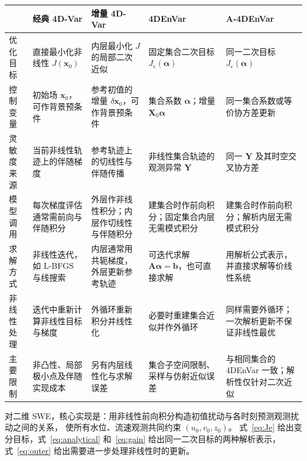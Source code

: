 \documentclass[11pt,a4paper]{article}
\newcommand{\xx}{\mathbf x}
\newcommand{\avec}{\bm\alpha}
\begin{document}
\begin{center}
\small
\setlength{\tabcolsep}{4pt}
\renewcommand{\arraystretch}{1.15}
\begin{tabularx}{\textwidth}{@{}>{\raggedright\arraybackslash}p{}
 >{\raggedright\arraybackslash}X
 >{\raggedright\arraybackslash}X
 >{\raggedright\arraybackslash}X
 >{\raggedright\arraybackslash}X@{}}
\toprule
 & 经典 4D-Var & 增量 4D-Var & 4DEnVar & A-4DEnVar\\
\midrule
优化目标 & 直接最小化非线性 $J(\xx_0)$ & 内层最小化 $J$ 的局部二次近似 & 固定集合二次目标 $J_e(\avec)$ & 同一二次目标 $J_e(\avec)$\\
\addlinespace
控制变量 & 初始场 $\xx_0$，可作背景预条件 & 参考初值的增量 $\delta\xx_0$，可作背景预条件 & 集合系数 $\avec$；增量 $\mathbf X_0\avec$ & 同一集合系数或等价协方差更新\\
\addlinespace
灵敏度来源 & 当前非线性轨迹上的伴随梯度 & 参考轨迹上的切线性与伴随传播 & 非线性集合轨迹的观测异常 $\mathbf Y$ & 同一 $\mathbf Y$ 及其时空交叉协方差\\
\addlinespace
模型调用 & 每次梯度评估通常需前向与伴随积分 & 外层作非线性积分；内层作切线性与伴随积分 & 建集合时作前向积分；固定集合内层无需模式积分 & 建集合时作前向积分；解析内层无需模式积分\\
\addlinespace
求解方式 & 非线性迭代，如 L-BFGS 与线搜索 & 内层通常用共轭梯度，外层更新参考轨迹 & 可迭代求解 $\mathbf A\avec=\mathbf b$，也可直接求解 & 用解析公式表示，并直接求解等价线性系统\\
\addlinespace
非线性处理 & 迭代中重新计算非线性目标与梯度 & 外循环重新积分并线性化 & 必要时重建集合近似并作外循环 & 同样需要外循环；一次解析更新不保证非线性最优\\
\addlinespace
主要限制 & 非凸性、局部极小点及伴随实现成本 & 另有内层线性化与求解误差 & 集合子空间限制、采样与仿射近似误差 & 与相同集合的 4DEnVar 一致；解析性仅针对二次近似\\
\bottomrule
\end{tabularx}
\end{center}

对二维 SWE，核心实现是：用非线性前向积分构造初值扰动与各时刻预测观测扰动之间的关系，
使所有水位、流速观测共同约束 $(u_0,v_0,z_0)$。
式~\eqref{eq:Je} 给出变分目标，式~\eqref{eq:analytical} 和~\eqref{eq:gain}
给出同一二次目标的两种解析表示，式~\eqref{eq:outer} 给出需要进一步处理非线性时的更新。
\end{document}

